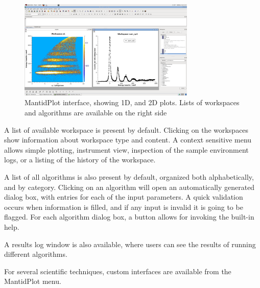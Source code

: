 \documentclass{elsarticle}
\begin{document}
\begin{figure}[!ht]
\centerline{\includegraphics[width=0.75\textwidth]{MantidPlot.png}}
\caption{MantidPlot interface, showing 1D, and 2D plots. Lists of workspaces and algorithms are available on the right side}
\label{fig:MantidPlot}
\end{figure}
A list of available workspace is present by default. Clicking on the workspaces show information about workspace type and content. A context sensitive menu allows simple plotting, instrument view, inspection of the sample environment logs, or a listing of the history of the workspace.

A list of all algorithms is also present by default, organized both alphabetically, and by category. Clicking on an algorithm will open an automatically generated dialog box, with entries for each of the input parameters. A quick validation occurs when information is filled, and if any input is invalid it is going to be flagged. For each algorithm dialog box, a button allows for invoking the built-in help.

A results log window is also available, where users can see the results of running different algorithms.

For several scientific techniques, custom interfaces are available from the MantidPlot menu.
\end{document}
